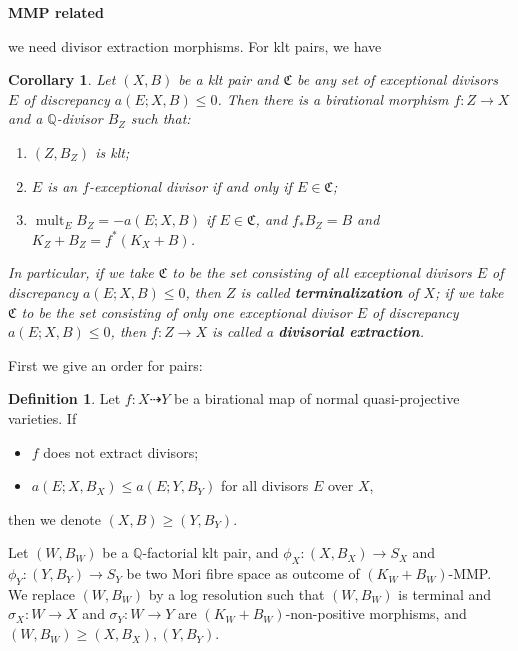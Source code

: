 \documentclass[11pt]{amsart}
\numberwithin{equation}{section}
\newtheorem{cor}[thm]{Corollary}
\theoremstyle{definition}
\newtheorem{defn}[thm]{Definition}
\theoremstyle{definition}
\theoremstyle{definition}
\begin{document}
\textbf{MMP related}

we need divisor extraction morphisms. For klt pairs, we have

\begin{cor}\label{klt extraction}
  \cite[Corollary 13.7]{haconMinimalModelProgram2012} Let $ (X,B) $ be a  klt pair and $\mathfrak{C}$ be any set of exceptional divisors $E$  of discrepancy $ a(E;X,B)\leqslant 0 $. Then there is a birational morphism $ f:Z\to X $ and a $ \mathbb{Q} $-divisor $ B_Z $ such that:
  \begin{enumerate}
    \item $ (Z,B_Z) $ is klt;
    \item $ E $ is an $f$-exceptional divisor if and only if $ E\in \mathfrak{C} $;
    \item $ \operatorname{mult}_{E}B_Z=-a(E;X,B) $ if $E \in \mathfrak{C}$, and $ f_*B_Z=B $ and $ K_Z+B_Z=f^*(K_X+B) $.
  \end{enumerate}
  In particular, if we take $\mathfrak{C}$ to be the set consisting of all exceptional divisors $E$ of discrepancy $a(E; X, B)\leqslant 0$, then $ Z $ is called \textbf{terminalization} of $ X $; if we take $\mathfrak{C}$ to be the set consisting of only one exceptional divisor $E$ of discrepancy $a(E; X, B)\leqslant 0$, then $ f: Z\to X $ is called a \textbf{divisorial extraction}.
\end{cor}
First we give an order for pairs:
\begin{defn}
  Let $f: X\dashrightarrow Y$ be a birational map of normal quasi-projective varieties. If
  \begin{itemize}
    \item $f$ does not extract divisors;
    \item $a(E;X,B_{X})\leqslant a(E;Y,B_{Y})$ for all divisors  $E$  over $X$,
  \end{itemize}
  then we denote $(X,B)\geqslant (Y,B_{Y})$.
\end{defn}

Let $(W,B_{W})$ be a $\mathbb{Q}$-factorial klt pair, and $\phi_X: (X,B_{X})\to S_{X}$ and $\phi_Y: (Y,B_{Y}) \to S_{Y} $ be two Mori fibre space as outcome of $(K_{W}+B_{W})$-MMP. We  replace $(W,B_W)$ by a log resolution such that $(W,B_{W})$ is terminal and $\sigma_{X}:W\to X$ and $\sigma_{Y}:W\to Y$ are $(K_W+B_W)$-non-positive morphisms, and $(W,B_W)\geqslant (X,B_{X}),(Y,B_{Y})$.
\end{document}
